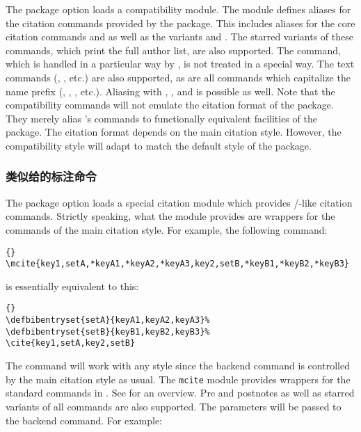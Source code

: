 The  package option loads a  compatibility module. The module defines aliases for the citation commands provided by the  package. This includes aliases for the core citation commands  and  as well as the variants  and . The starred variants of these commands, which print the full author list, are also supported. The  command, which is handled in a particular way by , is not treated in a special way. The text commands (, , etc.) are also supported, as are all commands which capitalize the name prefix (, , , etc.). Aliasing with , , and  is possible as well. Note that the compatibility commands will not emulate the citation format of the  package. They merely alias 's commands to functionally equivalent facilities of the \biblatex package. The citation format depends on the main citation style. However, the compatibility style will adapt  to match the default style of the  package.

\subsubsection[类似\sty{mcite}给的标注命令 \sty{mcite}-like Citation Commands]{类似给的标注命令 \BiberOnlyMark}
\label{use:cit:mct}

The  package option loads a special citation module which provides \slash {}-like citation commands. Strictly speaking, what the module provides are wrappers for the commands of the main citation style. For example, the following command:

\begin{lstlisting}[style=latex]{}
\mcite{key1,setA,*keyA1,*keyA2,*keyA3,key2,setB,*keyB1,*keyB2,*keyB3}
\end{lstlisting}
%
is essentially equivalent to this:

\begin{lstlisting}[style=latex]{}
\defbibentryset{setA}{keyA1,keyA2,keyA3}%
\defbibentryset{setB}{keyB1,keyB2,keyB3}%
\cite{key1,setA,key2,setB}
\end{lstlisting}
%
The  command will work with any style since the  backend command is controlled by the main citation style as usual. The \texttt{mcite} module provides wrappers for the standard commands in . See  for an overview. Pre and postnotes as well as starred variants of all commands are also supported. The parameters will be passed to the backend command. For example:

